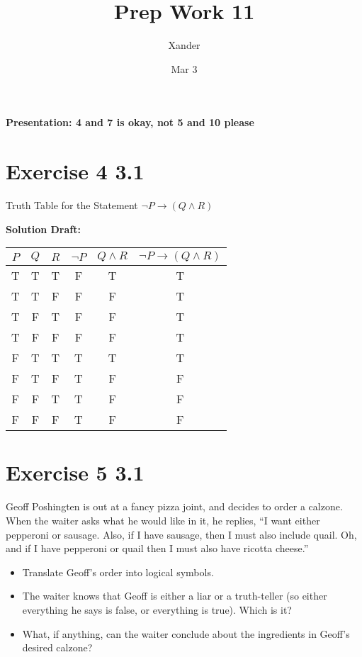 \documentclass{article}
\title{Prep Work 11}
\author{Xander}
\date{Mar 3}
\begin{document}
\maketitle
\noindent\textbf{Presentation: 4 and 7 is okay, not 5 and 10 please} 

\section*{Exercise 4 3.1}  

Truth Table for the Statement \(\neg P \rightarrow (Q \land R)\)

\vspace{0.5cm}
\noindent\textbf{Solution Draft:} 
\vspace{0.2cm}

\begin{tabular}{ccc|c|c|c}
    \(P\) & \(Q\) & \(R\) & \(\neg P\) & \(Q \land R\) & \(\neg P \rightarrow (Q \land R)\) \\
    \hline
    T & T & T & F & T & T \\
    T & T & F & F & F & T \\
    T & F & T & F & F & T \\
    T & F & F & F & F & T \\
    F & T & T & T & T & T \\
    F & T & F & T & F & F \\
    F & F & T & T & F & F \\
    F & F & F & T & F & F \\
    \end{tabular}

\section*{Exercise 5 3.1}  

Geoff Poshingten is out at a fancy pizza joint, and decides to order a calzone. When the waiter asks what he would like in it, he replies, “I want either pepperoni or sausage. Also, if I have sausage, then I must also include quail. Oh, and if I have pepperoni or quail then I must also have ricotta cheese.”
\begin{itemize}
    \item Translate Geoff's order into logical symbols.
    \item The waiter knows that Geoff is either a liar or a truth-teller (so either everything he says is false, or everything is true). Which is it?
    \item What, if anything, can the waiter conclude about the ingredients in Geoff's desired calzone?
\end{itemize}
\end{document}
